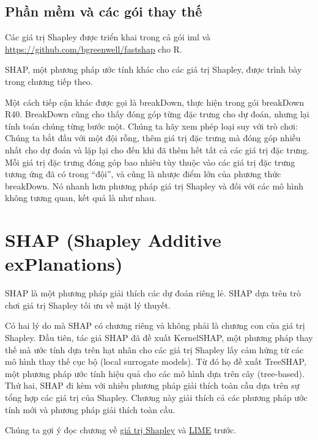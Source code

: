\subsection{Phần mềm và các gói thay thế}
Các giá trị Shapley được triển khai trong cả gói iml và \href{fastshap}{https://github.com/bgreenwell/fastshap} cho R.

SHAP, một phương pháp ước tính khác cho các giá trị Shapley, được trình bày trong chương tiếp theo.

Một cách tiếp cận khác được gọi là breakDown, thực hiện trong gói breakDown R40. BreakDown cũng cho thấy đóng góp từng đặc trưng cho dự đoán, nhưng lại tính toán chúng từng bước một. Chúng ta hãy xem phép loại suy với trò chơi: Chúng ta bắt đầu với một đội rỗng, thêm giá trị đặc trưng mà đóng góp nhiều nhất cho dự đoán và lặp lại cho đến khi đã thêm hết tất cả các giá trị đặc trưng. Mỗi giá trị đặc trưng đóng góp bao nhiêu tùy thuộc vào các giá trị đặc trưng tương ứng đã có trong ``đội'', và cũng là nhược điểm lớn của phương thức breakDown. Nó nhanh hơn phương pháp giá trị Shapley và đối với các mô hình không tương quan, kết quả là như nhau.

\clearpage

\section{SHAP (Shapley Additive exPlanations)}

SHAP là một phương pháp giải thích các dự đoán riêng lẻ. SHAP dựa trên trò chơi giá trị Shapley tối ưu về mặt lý thuyết.

Có hai lý do mà SHAP có chương riêng và không phải là chương con của giá trị Shapley. Đầu tiên, tác giả SHAP đã đề xuất KernelSHAP, một phương pháp thay thế mà ước tính dựa trên hạt nhân cho các giá trị Shapley lấy cảm hứng từ các mô hình thay thế cục bộ (local surrogate models). Từ đó họ đề xuất TreeSHAP, một phương pháp ước tính hiệu quả cho các mô hình dựa trên cây (tree-based). Thứ hai, SHAP đi kèm với nhiều phương pháp giải thích toàn cầu dựa trên sự tổng hợp các giá trị của Shapley. Chương này giải thích cả các phương pháp ước tính mới và phương pháp giải thích toàn cầu.

Chúng ta gợi ý đọc chương về \href{Chap_5.9}{giá trị Shapley} và \href{Chap_5.8}{LIME} trước. 

